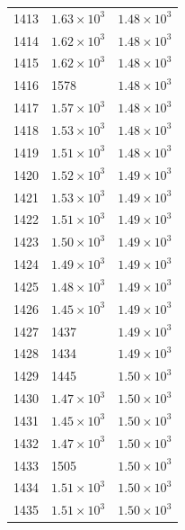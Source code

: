 \begin{table}[H]
\begin{tabular}{lll}
1413 & $\displaystyle 1.63 \times 10^{3}$ & $\displaystyle 1.48 \times 10^{3}$ \\
1414 & $\displaystyle 1.62 \times 10^{3}$ & $\displaystyle 1.48 \times 10^{3}$ \\
1415 & $\displaystyle 1.62 \times 10^{3}$ & $\displaystyle 1.48 \times 10^{3}$ \\
1416 & 1578 & $\displaystyle 1.48 \times 10^{3}$ \\
1417 & $\displaystyle 1.57 \times 10^{3}$ & $\displaystyle 1.48 \times 10^{3}$ \\
1418 & $\displaystyle 1.53 \times 10^{3}$ & $\displaystyle 1.48 \times 10^{3}$ \\
1419 & $\displaystyle 1.51 \times 10^{3}$ & $\displaystyle 1.48 \times 10^{3}$ \\
1420 & $\displaystyle 1.52 \times 10^{3}$ & $\displaystyle 1.49 \times 10^{3}$ \\
1421 & $\displaystyle 1.53 \times 10^{3}$ & $\displaystyle 1.49 \times 10^{3}$ \\
1422 & $\displaystyle 1.51 \times 10^{3}$ & $\displaystyle 1.49 \times 10^{3}$ \\
1423 & $\displaystyle 1.50 \times 10^{3}$ & $\displaystyle 1.49 \times 10^{3}$ \\
1424 & $\displaystyle 1.49 \times 10^{3}$ & $\displaystyle 1.49 \times 10^{3}$ \\
1425 & $\displaystyle 1.48 \times 10^{3}$ & $\displaystyle 1.49 \times 10^{3}$ \\
1426 & $\displaystyle 1.45 \times 10^{3}$ & $\displaystyle 1.49 \times 10^{3}$ \\
1427 & 1437 & $\displaystyle 1.49 \times 10^{3}$ \\
1428 & 1434 & $\displaystyle 1.49 \times 10^{3}$ \\
1429 & 1445 & $\displaystyle 1.50 \times 10^{3}$ \\
1430 & $\displaystyle 1.47 \times 10^{3}$ & $\displaystyle 1.50 \times 10^{3}$ \\
1431 & $\displaystyle 1.45 \times 10^{3}$ & $\displaystyle 1.50 \times 10^{3}$ \\
1432 & $\displaystyle 1.47 \times 10^{3}$ & $\displaystyle 1.50 \times 10^{3}$ \\
1433 & 1505 & $\displaystyle 1.50 \times 10^{3}$ \\
1434 & $\displaystyle 1.51 \times 10^{3}$ & $\displaystyle 1.50 \times 10^{3}$ \\
1435 & $\displaystyle 1.51 \times 10^{3}$ & $\displaystyle 1.50 \times 10^{3}$ \\

\end{tabular}
\end{table}
